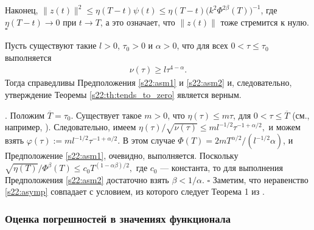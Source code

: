 \documentclass[../main.tex]{subfiles}
\begin{document}
Наконец, $ \|z(t)\|^2 \leqslant \eta(T-t)\psi(t) \leqslant \eta(T-t)\big(k^2\Phi^{2\beta}(T)\big)^{-1} $, 
где $\eta(T-t) \to 0$ при $t \to T$, а это означает, что $\|z(t)\|$ тоже стремится к нулю.
 \hfill $ \square $
\begin{corollary}%
Пусть существуют такие $ l > 0$, $\tau_0 > 0$ и $\alpha > 0$, что для всех $0 < \tau \leqslant \tau_0 $ выполняется
 \begin{gather}\label{s22:asymp}
 \nu(\tau)\geqslant l\tau^{4-\alpha}.
 \end{gather}
 Тогда справедливы Предположения \ref{s22:asm1} и \ref{s22:asm2} и, следовательно, утверждение Теоремы \ref{s22:th:tends_to_zero} является верным.
\end{corollary}
\doc. 
Положим $\overline{T}=\tau_0$. 
Существует такое $m>0$, что $\eta(\tau)\leqslant m \tau$, для $0 < \tau \leqslant\overline{T}$ (см., например, \cite{GusevOsipov}). 
Следовательно, имеем $
\eta(\tau)/\sqrt{\nu(\tau)} \leqslant 
 ml^{-1/2}\tau^{-1+\alpha/2},$
и можем взять $\varphi(\tau):= 
 ml^{-1/2}\tau^{-1+\alpha/2}$. 
В этом случае 
$\Phi(T)=2mT^{\alpha/2}/(l^{-1/2}\alpha)$, и Предположение \ref{s22:asm1}, очевидно, выполняется. 
Поскольку 
$\sqrt{\eta(T)}/\Phi^\beta(T) \leqslant c_0T^{(1-\alpha\beta)/2},$
где $c_0$ --- константа, то для выполнения Предположения \ref{s22:asm2} достаточно взять $\beta < 1/\alpha$.
 \hfill $ \square $
Заметим, что неравенство \eqref{s22:asymp} совпадает с условием, из которого следует Теорема 1 из \cite{GusevOsipov}.

\subsubsection{Оценка погрешностей в значениях функционала}
\end{document}
